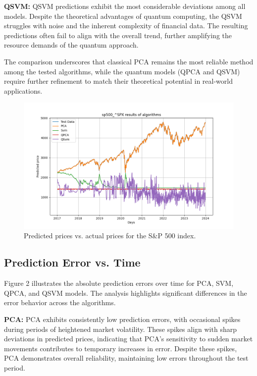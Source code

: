 \documentclass[journal]{IEEEtran}
\begin{document}
\textbf{QSVM:} QSVM predictions exhibit the most considerable deviations among all models. Despite the theoretical advantages of quantum computing, the QSVM struggles with noise and the inherent complexity of financial data. The resulting predictions often fail to align with the overall trend, further amplifying the resource demands of the quantum approach.

The comparison underscores that classical PCA remains the most reliable method among the tested algorithms, while the quantum models (QPCA and QSVM) require further refinement to match their theoretical potential in real-world applications.


\begin{figure}[ht!]
    \centering
    \includegraphics[width=\linewidth]{predicted_vs_actual_price.png}
    \caption{Predicted prices vs. actual prices for the S\&P 500 index.}
    \label{fig:price_comparison}
\end{figure}

\subsection{Prediction Error vs. Time}

Figure 2 illustrates the absolute prediction errors over time for PCA, SVM, QPCA, and QSVM models. The analysis highlights significant differences in the error behavior across the algorithms.

\textbf{PCA:} PCA exhibits consistently low prediction errors, with occasional spikes during periods of heightened market volatility. These spikes align with sharp deviations in predicted prices, indicating that PCA's sensitivity to sudden market movements contributes to temporary increases in error. Despite these spikes, PCA demonstrates overall reliability, maintaining low errors throughout the test period.
\end{document}
